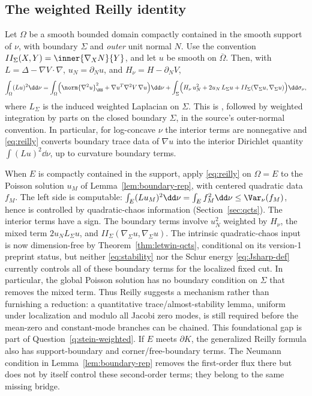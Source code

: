 \documentclass[../../main.tex]{subfiles}
\begin{document}
\subsection{The weighted Reilly identity}

\begin{proposition}
\label{prop:reilly}
Let $\Omega$ be a smooth bounded domain compactly contained in the smooth support of $\nu$, with
boundary $\Sigma$ and \emph{outer} unit normal $N$. Use the convention
$II_\Sigma(X,Y)=\inner{\nabla_XN}{Y}$, and let $u$ be smooth on $\overline\Omega$. Then, with
$L=\Delta-\nabla V\cdot\nabla$, $u_N=\partial_Nu$, and $H_\nu=H-\partial_NV$,
\begin{equation}\label{eq:reilly}
  \int_\Omega(Lu)^2\dd\nu
  =\int_\Omega\Bigl(\norm{\nabla^2u}_\HS^2+\nabla u^T\nabla^2V\,\nabla u\Bigr)\dd\nu
  +\int_\Sigma\Bigl(H_\nu\,u_N^2+2u_N\,L_\Sigma u
  +II_\Sigma(\nabla_\Sigma u,\nabla_\Sigma u)\Bigr)\dd\sigma_\nu ,
\end{equation}
where $L_\Sigma$ is the induced weighted Laplacian on $\Sigma$. This is
\cite[Thm.~1]{MaDu2010}, followed by weighted integration by parts on the closed boundary
$\Sigma$, in the source's outer-normal convention.
In particular, for log-concave $\nu$ the interior terms are nonnegative and
\eqref{eq:reilly} converts boundary trace data of $\nabla u$ into the interior Dirichlet
quantity $\int(Lu)^2\dd\nu$, up to curvature boundary terms.
\end{proposition}

\begin{remark}
\label{rem:dirichlet-trace}
When $E$ is compactly contained in the support, apply \eqref{eq:reilly} on $\Omega=E$ to the Poisson solution $u_M$ of
Lemma~\ref{lem:boundary-rep}, with centered quadratic data $f_M$. The left side is computable:
$\int_E(Lu_M)^2\dd\nu=\int_E f_M^2\dd\nu\le\Var_\nu(f_M)$, hence is controlled by
quadratic-chaos information (Section~\ref{sec:qcts}). The
interior terms have a sign. The boundary terms involve $u_N^2$ weighted by $H_\nu$, the mixed
term $2u_NL_\Sigma u$, and $II_\Sigma(\nabla_\Sigma u,\nabla_\Sigma u)$. The intrinsic
quadratic-chaos input is now dimension-free by Theorem~\ref{thm:letwin-qcts}, conditional on its
version-1 preprint status, but neither \eqref{eq:stability} nor the Schur energy
\eqref{eq:Jsharp-def} currently controls all of these boundary terms for the localized fixed cut.
In particular, the global Poisson solution has no boundary condition on $\Sigma$ that removes the
mixed term. Thus Reilly suggests a mechanism rather than furnishing a reduction: a quantitative
trace/almost-stability lemma, uniform under localization and modulo all Jacobi zero modes, is
still required before the mean-zero and constant-mode branches can be chained. This foundational
gap is part of Question~\ref{q:stein-weighted}. If $E$ meets $\partial K$, the generalized
Reilly formula also has support-boundary and corner/free-boundary terms. The Neumann condition in
Lemma~\ref{lem:boundary-rep} removes the first-order flux there but does not by itself control
these second-order terms; they belong to the same missing bridge.
\end{remark}
\end{document}
